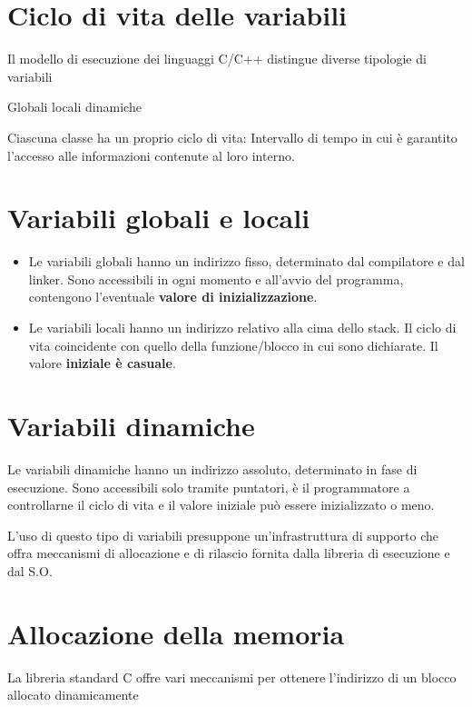 \section{Ciclo di vita delle variabili  }

Il modello di esecuzione dei linguaggi C/C++ distingue diverse tipologie di variabili

\begin{center}
  Globali \qquad  locali \qquad  dinamiche
\end{center}


Ciascuna classe ha un proprio ciclo di vita: Intervallo di tempo in cui è garantito l'accesso alle informazioni contenute al loro interno.

\section{Variabili globali e locali  }

\begin{itemize}
  \item Le variabili globali hanno un indirizzo fisso, determinato dal compilatore e dal linker. Sono accessibili in ogni momento e all'avvio del programma, contengono l'eventuale \textbf{valore di inizializzazione}.
  \item Le variabili locali hanno un indirizzo relativo alla cima dello stack. Il ciclo di vita coincidente con quello della funzione/blocco in cui sono dichiarate. Il valore \textbf{iniziale è casuale}.
\end{itemize}

\section{Variabili dinamiche}

Le variabili dinamiche hanno un indirizzo assoluto, determinato in fase di esecuzione. Sono accessibili solo tramite puntatori, è il programmatore a controllarne il ciclo di vita e il valore iniziale può essere inizializzato o meno.


L'uso di questo tipo di variabili presuppone un'infrastruttura di supporto che offra meccanismi di allocazione e di rilascio fornita dalla libreria di esecuzione e dal S.O.

\section{Allocazione della memoria  }

La libreria standard C offre vari meccanismi per ottenere l'indirizzo di un blocco allocato dinamicamente


